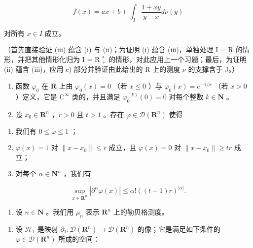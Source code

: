 \[
f (x) = a x + b + \int_ {\mathrm{J}} \frac {1 + x y}{y - x} d \nu (y)
\]

对所有 \(x \in I\) 成立。

（首先直接验证 (iii) 蕴含 (i) 与 (ii)；为证明 (i) 蕴含 (iii)，单独处理 I = R 的情形，并把其他情形化归为 I = R \(_{+}^{*}\) 的情形，对此应用上一个习题；最后，为证明 (ii) 蕴含 (iii)，应用 c) 部分并验证由此给出的 R 上的测度 \(\nu\) 的支撑含于 J。）

\exercisesection{}

\begin{enumerate}
\def\labelenumi{\arabic{enumi})}
\item
  函数 \(\varphi_0\) 在 \(\mathbf{R}\) 上由 \(\varphi_0(x) = 0\) （若 \(x \leqslant 0\) ）与 \(\varphi_0(x) = e^{-1/x}\) （若 \(x > 0\) ）定义，它是 \(\mathrm{C}^\infty\) 类的，并且满足 \(\varphi_0^{(k)}(0) = 0\) 对每个整数 \(k \in \mathbf{N}\) 。
\item
  设 \(x_0 \in \mathbf{R}^n\) ，\(r > 0\) 且 \(t > 1\) 。存在 \(\varphi \in \mathcal{D}(\mathbf{R}^n)\) 使得
\end{enumerate}

\begin{enumerate}
\def\labelenumi{(\roman{enumi})}
\item
  我们有 \(0 \leqslant \varphi \leqslant 1\) ；
\item
  \(\varphi(x)=1\) 对 \(\|x-x_{0}\|\leqslant r\) 成立，且 \(\varphi(x)=0\) 对 \(\|x-x_{0}\|\geqslant tr\) 成立；
\item
  对每个 \(\alpha \in \mathbf{N}^n\) ，我们有
\end{enumerate}

\[
\sup _ {x \in \mathbf {R} ^ {n}} | \partial^ {\alpha} \varphi (x) | \leqslant \alpha ! ((t - 1) r) ^ {| \alpha |}.
\]

\begin{enumerate}
\def\labelenumi{\arabic{enumi})}
\setcounter{enumi}{2}
\tightlist
\item
  设 \(n \in \mathbf{N}\) 。我们用 \(\mu_n\) 表示 \(\mathbf{R}^n\) 上的勒贝格测度。
\end{enumerate}

\begin{enumerate}
\def\labelenumi{\alph{enumi})}
\tightlist
\item
  设 \(\mathcal{H}_1\) 是映射 \(\partial_1\colon \mathcal{D}(\mathbf{R}^n)\to \mathcal{D}(\mathbf{R}^n)\) 的像；它是满足如下条件的 \(\varphi \in \mathcal{D}(\mathbf{R}^n)\) 所成的空间：
\end{enumerate}


